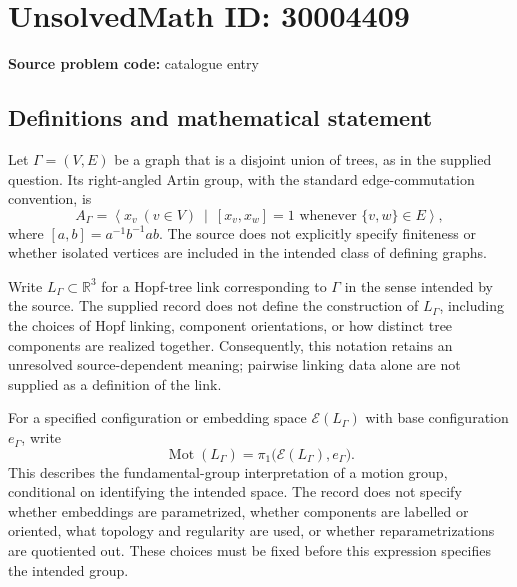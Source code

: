 \documentclass[11pt]{article}
\newcommand{\R}{\mathbb{R}}
\begin{document}
\section*{UnsolvedMath ID: 30004409}
\textbf{Source problem code:} catalogue entry
\subsection{Definitions and mathematical statement}
Let \(\Gamma=(V,E)\) be a graph that is a disjoint union of trees, as in the supplied question. Its right-angled Artin group, with the standard edge-commutation convention, is
\[
A_\Gamma=\left\langle x_v\ (v\in V)\ \middle|\ [x_v,x_w]=1\text{ whenever }\{v,w\}\in E\right\rangle,
\]
where \([a,b]=a^{-1}b^{-1}ab\). The source does not explicitly specify finiteness or whether isolated vertices are included in the intended class of defining graphs.

Write \(L_\Gamma\subset\R^3\) for a Hopf-tree link corresponding to \(\Gamma\) in the sense intended by the source. The supplied record does not define the construction of \(L_\Gamma\), including the choices of Hopf linking, component orientations, or how distinct tree components are realized together. Consequently, this notation retains an unresolved source-dependent meaning; pairwise linking data alone are not supplied as a definition of the link.

For a specified configuration or embedding space \(\mathcal E(L_\Gamma)\) with base configuration \(e_\Gamma\), write
\[
\operatorname{Mot}(L_\Gamma)=\pi_1\bigl(\mathcal E(L_\Gamma),e_\Gamma\bigr).
\]
This describes the fundamental-group interpretation of a motion group, conditional on identifying the intended space. The record does not specify whether embeddings are parametrized, whether components are labelled or oriented, what topology and regularity are used, or whether reparametrizations are quotiented out. These choices must be fixed before this expression specifies the intended group.
\end{document}
